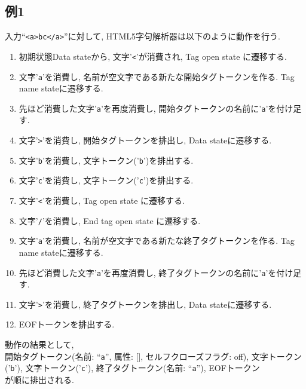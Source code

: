 \documentclass[uplatex,a4j]{jsreport}
\begin{document}
\subsection{例1}
入力``\texttt{<a>bc</a>}''に対して, HTML5字句解析器は以下のように動作を行う.\\
\begin{enumerate}
    \item 初期状態Data stateから, 文字'\texttt{<}'が消費され, Tag open state に遷移する.
    \item 文字'\texttt{a}'を消費し, 名前が空文字である新たな開始タグトークンを作る. Tag name stateに遷移する.
    \item 先ほど消費した文字'\texttt{a}'を再度消費し, 開始タグトークンの名前に'\texttt{a}'を付け足す.
    \item 文字'\texttt{>}'を消費し, 開始タグトークンを排出し, Data stateに遷移する.
    \item 文字'\texttt{b}'を消費し, 文字トークン('\texttt{b}')を排出する.
    \item 文字'\texttt{c}'を消費し, 文字トークン('\texttt{c}')を排出する.
    \item 文字'\texttt{<}'を消費し, Tag open state に遷移する.
    \item 文字'\texttt{/}'を消費し, End tag open state に遷移する.
    \item 文字'\texttt{a}'を消費し, 名前が空文字である新たな終了タグトークンを作る. Tag name stateに遷移する.
    \item 先ほど消費した文字'\texttt{a}'を再度消費し, 終了タグトークンの名前に'\texttt{a}'を付け足す.
    \item 文字'\texttt{>}'を消費し, 終了タグトークンを排出し, Data stateに遷移する.
    \item EOFトークンを排出する.
\end{enumerate}
動作の結果として,\\
開始タグトークン(名前: ``\texttt{a}'', 属性: [], セルフクローズフラグ: off), 文字トークン('\texttt{b}'), 文字トークン('\texttt{c}'), 終了タグトークン(名前: ``\texttt{a}''), EOFトークン\\
が順に排出される.
\end{document}
